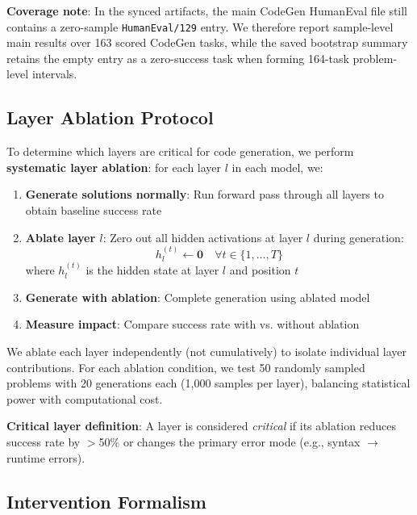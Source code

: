 \documentclass[preprint,12pt,authoryear]{elsarticle}
\begin{document}
\noindent\textbf{Coverage note}: In the synced artifacts, the main CodeGen HumanEval file still contains a zero-sample \texttt{HumanEval/129} entry. We therefore report sample-level main results over 163 scored CodeGen tasks, while the saved bootstrap summary retains the empty entry as a zero-success task when forming 164-task problem-level intervals.

\subsection{Layer Ablation Protocol}

To determine which layers are critical for code generation, we perform \textbf{systematic layer ablation}: for each layer $l$ in each model, we:

\begin{enumerate}
\item \textbf{Generate solutions normally}: Run forward pass through all layers to obtain baseline success rate

\item \textbf{Ablate layer $l$}: Zero out all hidden activations at layer $l$ during generation:
\begin{equation}
h_l^{(t)} \leftarrow \mathbf{0} \quad \forall t \in \{1, \ldots, T\}
\end{equation}
where $h_l^{(t)}$ is the hidden state at layer $l$ and position $t$

\item \textbf{Generate with ablation}: Complete generation using ablated model

\item \textbf{Measure impact}: Compare success rate with vs. without ablation
\end{enumerate}

We ablate each layer independently (not cumulatively) to isolate individual layer contributions. For each ablation condition, we test 50 randomly sampled problems with 20 generations each (1,000 samples per layer), balancing statistical power with computational cost.

\textbf{Critical layer definition}: A layer is considered \emph{critical} if its ablation reduces success rate by $>$50\% or changes the primary error mode (e.g., syntax $\rightarrow$ runtime errors).

\subsection{Intervention Formalism}
\end{document}
